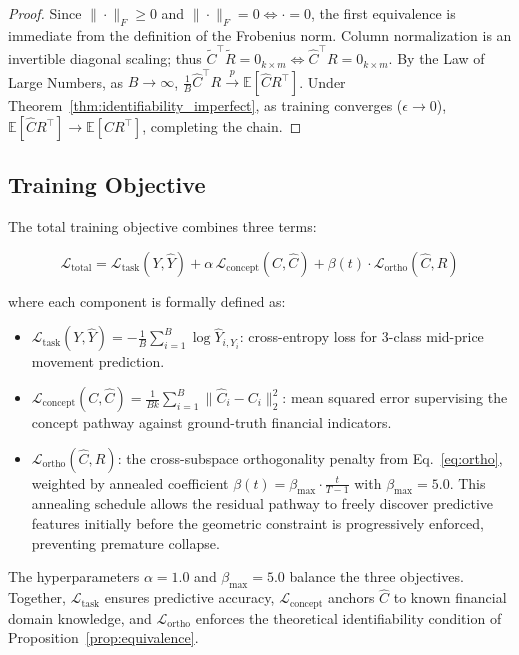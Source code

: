 \documentclass[twoside,11pt]{article}
\begin{document}
\begin{proof}
Since $\|\cdot\|_F \geq 0$ and $\|\cdot\|_F = 0 \Leftrightarrow \cdot = 0$, the first equivalence is immediate from the definition of the Frobenius norm. Column normalization is an invertible diagonal scaling; thus $\tilde{C}^\top \tilde{R} = 0_{k\times m} \Leftrightarrow \hat{C}^\top R = 0_{k \times m}$. By the Law of Large Numbers, as $B \to \infty$, $\frac{1}{B}\hat{C}^\top R \xrightarrow{p} \mathbb{E}[\hat{C} R^\top]$. Under Theorem~\ref{thm:identifiability_imperfect}, as training converges ($\epsilon \to 0$), $\mathbb{E}[\hat{C} R^\top] \to \mathbb{E}[C R^\top]$, completing the chain.
\end{proof}

\subsection{Training Objective}

The total training objective combines three terms:

\begin{equation}
    \mathcal{L}_{\text{total}} = \mathcal{L}_{\text{task}}(Y, \hat{Y}) + \alpha\, \mathcal{L}_{\text{concept}}(C, \hat{C}) + \beta(t)\cdot \mathcal{L}_{\text{ortho}}(\hat{C}, R)
    \label{eq:loss}
\end{equation}

where each component is formally defined as:
\begin{itemize}
    \item $\mathcal{L}_{\text{task}}(Y, \hat{Y}) = -\frac{1}{B}\sum_{i=1}^{B} \log \hat{Y}_{i, Y_i}$: cross-entropy loss for 3-class mid-price movement prediction.
    \item $\mathcal{L}_{\text{concept}}(C, \hat{C}) = \frac{1}{Bk}\sum_{i=1}^{B}\|\hat{C}_i - C_i\|_2^2$: mean squared error supervising the concept pathway against ground-truth financial indicators.
    \item $\mathcal{L}_{\text{ortho}}(\hat{C}, R)$: the cross-subspace orthogonality penalty from Eq.~\eqref{eq:ortho}, weighted by annealed coefficient $\beta(t) = \beta_{\max} \cdot \frac{t}{T-1}$ with $\beta_{\max} = 5.0$. This annealing schedule allows the residual pathway to freely discover predictive features initially before the geometric constraint is progressively enforced, preventing premature collapse.
\end{itemize}

The hyperparameters $\alpha = 1.0$ and $\beta_{\max} = 5.0$ balance the three objectives. Together, $\mathcal{L}_{\text{task}}$ ensures predictive accuracy, $\mathcal{L}_{\text{concept}}$ anchors $\hat{C}$ to known financial domain knowledge, and $\mathcal{L}_{\text{ortho}}$ enforces the theoretical identifiability condition of Proposition~\ref{prop:equivalence}.
\end{document}
